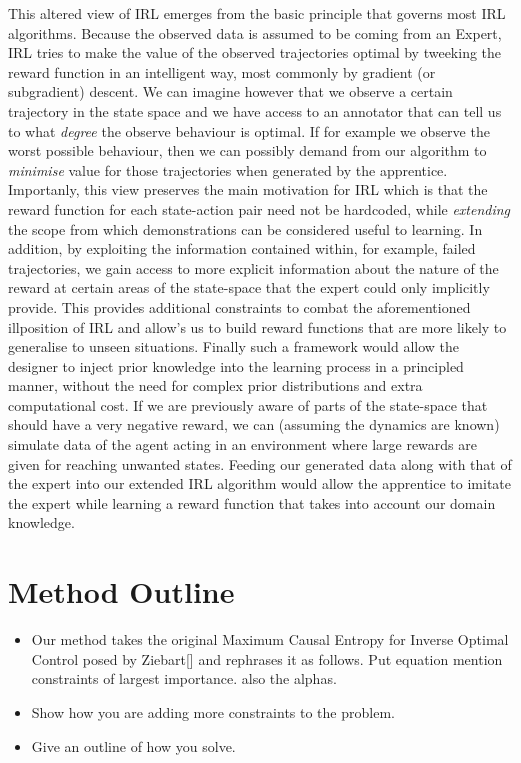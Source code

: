 \documentclass[conference]{IEEEtran}
\begin{document}
This altered view of IRL emerges from the basic principle that governs most IRL algorithms. Because the observed data is assumed to be coming from an Expert, IRL tries to make the value of the observed trajectories optimal by tweeking the reward function in an intelligent way, most commonly by gradient (or subgradient) descent. We can imagine however that we observe a certain trajectory in the state space and we have access to an annotator that can tell us to what \emph{degree} the observe behaviour is optimal. If for example we observe the worst possible behaviour, then we can possibly demand from our algorithm to \emph{minimise} value for those trajectories when generated by the apprentice. Importanly, this view preserves the main motivation for IRL which is that the reward function for each state-action pair need not be hardcoded, while \emph{extending} the scope from which demonstrations can be considered useful to learning. In addition, by exploiting the information contained within, for example, failed trajectories, we gain access to more explicit information about the nature of the reward at certain areas of the state-space that the expert could only implicitly provide. This provides additional constraints to combat the aforementioned illposition of IRL and allow's us to build reward functions that are more likely to generalise to unseen situations. Finally such a framework would allow the designer to inject prior knowledge into the learning process in a principled manner, without the need for complex prior distributions and extra computational cost. If we are previously aware of parts of the state-space that should have a very negative reward, we can (assuming the dynamics are known) simulate data of the agent acting in an environment where large rewards are given for reaching unwanted states. Feeding our generated data along with that of the expert into our extended IRL algorithm would allow the apprentice to imitate the expert while learning a reward function that takes into account our domain knowledge.



\section{Method Outline}
	\begin{itemize}	
		\item Our method takes the original Maximum Causal Entropy for Inverse Optimal Control posed by Ziebart[] and rephrases it as follows. Put equation mention constraints of largest importance. also the alphas. 
		\item Show how you are adding more constraints to the problem.
		\item Give an outline of how you solve. 
	\end{itemize}
\end{document}
